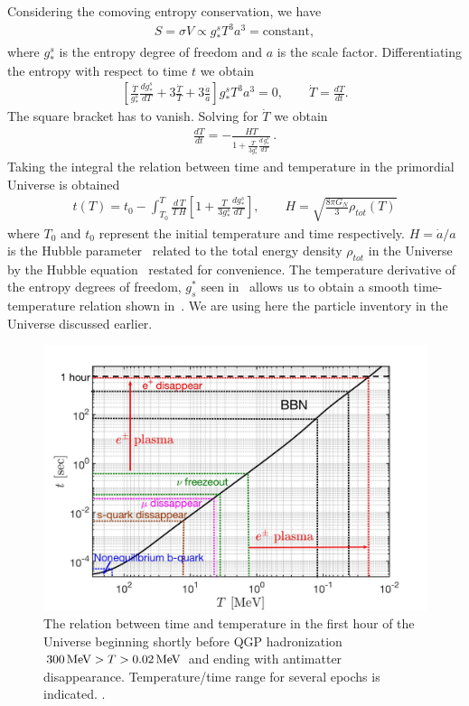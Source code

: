 Considering the comoving entropy conservation, we have
\begin{align}
S=\sigma V\propto g^s_\ast T^3a^3=\mathrm{constant},
\end{align}
where $g^s_\ast$ is the entropy degree of freedom and $a$ is the scale factor. Differentiating the entropy with respect to time $t$ we obtain
\begin{align}
\left[\frac{\dot{T}}{g^s_\ast}\frac{dg^s_\ast}{dT}+3\frac{\dot{T}}{T}+3\frac{\dot{a}}{a}\right]g^s_\ast T^3a^3=0,\qquad \dot{T}=\frac{dT}{dt}.
\end{align}
The square bracket has to vanish. Solving for $\dot T $ we obtain
\begin{align}
\frac{dT}{dt}=-\frac{HT}{1+\frac{T}{3g^s_\ast}\frac{d\,g^s_\ast}{dT}}\,.
\end{align}
Taking the integral the relation between time and temperature in the primordial Universe is obtained
\begin{align}\label{time}
t(T)=t_0-\int^T_{T_0} \frac{d\,T }{T\,H}\left[1+\frac{T}{3g^s_\ast}\frac{dg^s_\ast}{dT}\right],\qquad H=\sqrt{\frac{8\pi G_N}{3}\rho_{tot}(T)}
\end{align}
where $T_0$ and $t_0$ represent the initial temperature and time respectively. $H=\dot a/a$ is the Hubble parameter~ related to the total energy density $\rho_{tot}$ in the Universe by the Hubble equation~ restated for convenience. The temperature derivative of the entropy degrees of freedom, $g^\ast_s$ seen in~ allows us to obtain a smooth time-temperature relation shown in~. We are using here the particle inventory in the Universe discussed earlier.

\begin{figure}
\centerline{\includegraphics[width=0.90\linewidth]{plots/CosmicTimeTemperature.jpg}}
 \caption{The relation between time and temperature in the first hour of the Universe beginning shortly before QGP hadronization $300\text{\,MeV} >T>0.02\text{\,MeV}  $ and ending with antimatter disappearance. Temperature/time range for several epochs is indicated. .}
 \label{Fig:Overview}
\end{figure}

